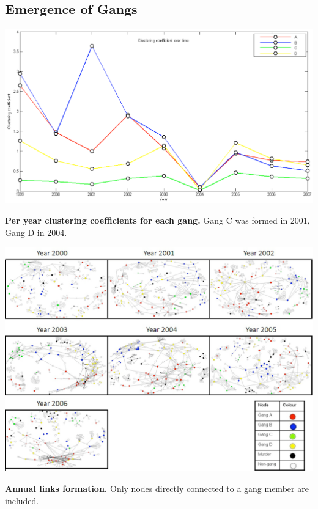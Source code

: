 \documentclass[pdftex]{beamer}
\begin{document}
\subsection{Emergence of Gangs}

\begin{frame}
\begin{center}
\includegraphics[width=0.9\paperwidth]{../images/gangscc1years.pdf}
\end{center}
\scriptsize{{\textbf{Per year clustering coefficients for each gang.}} Gang C was formed
in 2001, Gang D in 2004.}
\end{frame}

\begin{frame}
\begin{center}
\includegraphics[width=0.8\paperwidth]{../images/all.pdf}
\end{center}
\scriptsize{{\textbf{Annual links formation.}} Only nodes directly
  connected to a gang member are included.}
\end{frame}
\end{document}
